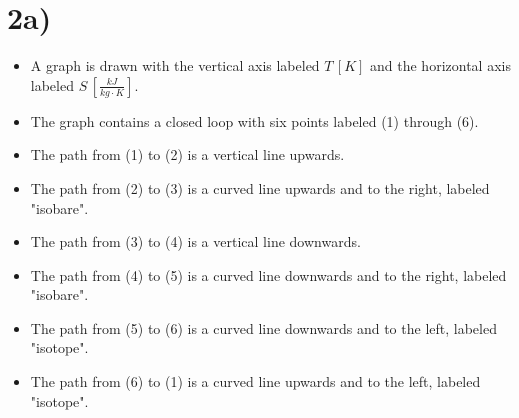 

\section*{2a)}

\begin{itemize}
    \item A graph is drawn with the vertical axis labeled \( T \, [K] \) and the horizontal axis labeled \( S \, \left[ \frac{kJ}{kg \cdot K} \right] \).
    \item The graph contains a closed loop with six points labeled (1) through (6).
    \item The path from (1) to (2) is a vertical line upwards.
    \item The path from (2) to (3) is a curved line upwards and to the right, labeled "isobare".
    \item The path from (3) to (4) is a vertical line downwards.
    \item The path from (4) to (5) is a curved line downwards and to the right, labeled "isobare".
    \item The path from (5) to (6) is a curved line downwards and to the left, labeled "isotope".
    \item The path from (6) to (1) is a curved line upwards and to the left, labeled "isotope".
\end{itemize}